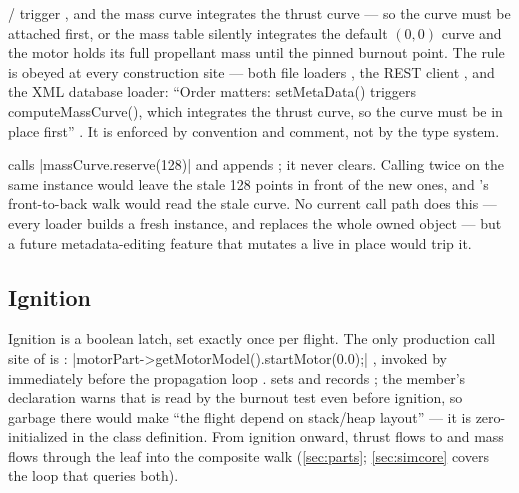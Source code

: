 \begin{designrule}
/ trigger 
, and the mass curve integrates the thrust curve --- so the
curve must be attached first, or the mass table silently integrates the default $(0,0)$
curve and the motor holds its full propellant mass until the pinned burnout point. The
rule is obeyed at every construction
site --- both file loaders 
, the REST client ,
and the XML database loader: ``Order matters: setMetaData() triggers computeMassCurve(),
which integrates the thrust curve, so the curve must be in place first''
. It is enforced by convention and comment, not
by the type system.
\end{designrule}


\begin{keyinsight}
 calls \cppinline|massCurve.reserve(128)| and appends
; it never clears. Calling  twice on
the same instance would leave the stale 128 points in front of the new ones, and
's front-to-back walk would read the stale curve. No current call path
does this --- every loader builds a fresh instance, and 
replaces the whole owned object  --- but a future
metadata-editing feature that mutates a live  in place would trip it.
\end{keyinsight}

\subsection{Ignition}\label{sec:motors-ignition}

Ignition is a boolean latch, set exactly once per flight. The only production call site
of  is :
\cppinline|motorPart->getMotorModel().startMotor(0.0);| ,
invoked by  immediately before the propagation loop
.  sets  and records
 ; the member's declaration warns that
 is read by the burnout test even before ignition, so garbage there
would make ``the flight depend on stack/heap layout''  ---
it is zero-initialized in the class definition. From ignition onward, thrust flows to
  and mass flows through the
 leaf into the composite walk 
(\cref{sec:parts}; \cref{sec:simcore} covers the loop that queries both).

